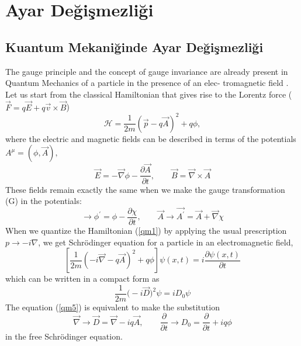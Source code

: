 \chapter{Ayar Değişmezliği}
\section{Kuantum Mekaniğinde Ayar Değişmezliği}
The gauge principle and the concept of gauge invariance are already
present in Quantum Mechanics of a particle in the presence of an elec-
tromagnetic field . Let us start from the classical Hamiltonian that
gives rise to the Lorentz force ($\vec{F} = q\vec{E} + q\vec{v} \times \vec{B}$)
\begin{equation} \label{qm1}
\mathcal{H} = \frac{1}{2m} (\vec{p} - q\vec{A})^2 + q\phi,
\end{equation}	
where the electric and magnetic fields can be described in terms of the
potentials $A^\mu = (\phi,\vec{A}), $
\begin{equation} \label{qm2}
\vec{E} = -\vec{\nabla}\phi -\frac{\partial \vec{A}}{\partial t}, \qquad \vec{B} = \vec{\nabla} \times \vec{A}
\end{equation}  
These fields remain exactly the same when we make the gauge transformation (G) in the potentials:
\begin{equation} \label{qm3}
\to \phi^{'} = \phi - \frac{\partial \chi}{\partial t}, \qquad \vec{A} \to \vec{A^{'}} = \vec{A} + \vec{\nabla}\chi
\end{equation}  
When we quantize the Hamiltonian (\ref{qm1}) by applying the usual prescription $p \to -i\nabla$, we get Schrödinger equation for a particle in an electromagnetic field,
\begin{equation} \label{qm4}
\left[ \frac{1}{2m}\left(-i\vec{\nabla} - q\vec{A} \right)^2  +q\phi \right] \psi(x,t) = i\frac{\partial\psi(x,t)}{\partial t}
\end{equation}  
which can be written in a compact form as 
\begin{equation} \label{qm5}
\frac{1}{2m}\big(-i\vec{D}\big)^2\psi = iD_0\psi
\end{equation}
The equation (\ref{qm5}) is equivalent to make the substitution
\begin{equation} \label{qm6}
\vec{\nabla} \to \vec{D} = \vec{\nabla} - iq\vec{A} ,\qquad \frac{\partial}{\partial t} \to D_0 = \frac{\partial}{\partial t} + iq\phi
\end{equation}
in the free Schrödinger equation.

